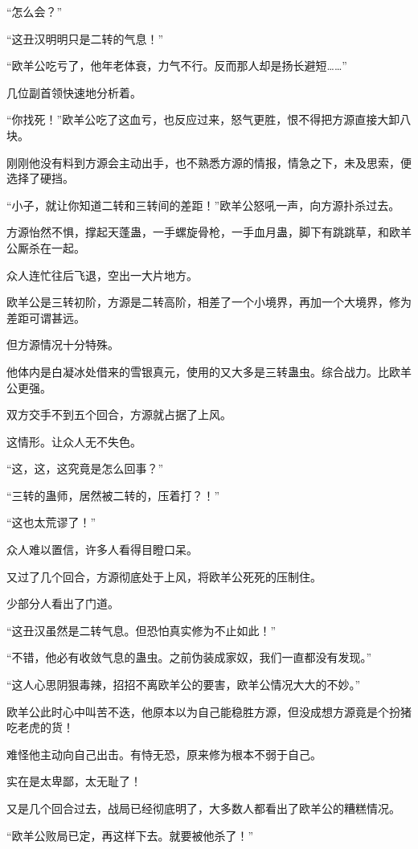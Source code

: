 \begin{this_body}
“怎么会？”

“这丑汉明明只是二转的气息！”

“欧羊公吃亏了，他年老体衰，力气不行。反而那人却是扬长避短……”

几位副首领快速地分析着。

“你找死！”欧羊公吃了这血亏，也反应过来，怒气更胜，恨不得把方源直接大卸八块。

刚刚他没有料到方源会主动出手，也不熟悉方源的情报，情急之下，未及思索，便选择了硬挡。

“小子，就让你知道二转和三转间的差距！”欧羊公怒吼一声，向方源扑杀过去。

方源怡然不惧，撑起天蓬蛊，一手螺旋骨枪，一手血月蛊，脚下有跳跳草，和欧羊公厮杀在一起。

众人连忙往后飞退，空出一大片地方。

欧羊公是三转初阶，方源是二转高阶，相差了一个小境界，再加一个大境界，修为差距可谓甚远。

但方源情况十分特殊。

他体内是白凝冰处借来的雪银真元，使用的又大多是三转蛊虫。综合战力。比欧羊公更强。

双方交手不到五个回合，方源就占据了上风。

这情形。让众人无不失色。

“这，这，这究竟是怎么回事？”

“三转的蛊师，居然被二转的，压着打？！”

“这也太荒谬了！”

众人难以置信，许多人看得目瞪口呆。

又过了几个回合，方源彻底处于上风，将欧羊公死死的压制住。

少部分人看出了门道。

“这丑汉虽然是二转气息。但恐怕真实修为不止如此！”

“不错，他必有收敛气息的蛊虫。之前伪装成家奴，我们一直都没有发现。”

“这人心思阴狠毒辣，招招不离欧羊公的要害，欧羊公情况大大的不妙。”

欧羊公此时心中叫苦不迭，他原本以为自己能稳胜方源，但没成想方源竟是个扮猪吃老虎的货！

难怪他主动向自己出击。有恃无恐，原来修为根本不弱于自己。

实在是太卑鄙，太无耻了！

又是几个回合过去，战局已经彻底明了，大多数人都看出了欧羊公的糟糕情况。

“欧羊公败局已定，再这样下去。就要被他杀了！”


\end{this_body}
